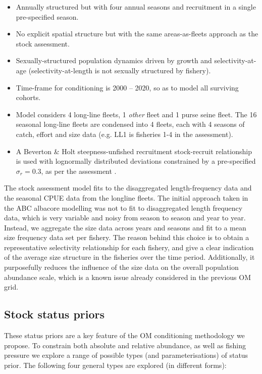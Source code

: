 \documentclass[12pt,a4paper,twoside,times,sky,standard]{csiroreport2017}
\begin{document}
\begin{itemize}
    \item Annually structured but with four annual seasons and recruitment in a single pre-specified season.
    \item No explicit spatial structure but with the same areas-as-fleets approach as the stock assessment.
    \item Sexually-structured population dynamics driven by growth and selectivity-at-age (selectivity-at-length is not sexually structured by fishery).
    \item Time-frame for conditioning is 2000 -- 2020, so as to model all surviving cohorts.
    \item Model considers 4 long-line fleets, 1 \emph{other} fleet and 1 purse seine fleet. The 16 seasonal long-line fleets are condensed into 4 fleets, each with 4 seasons of catch, effort and size data (e.g. LL1 is fisheries 1-4 in the assessment).
    \item A Beverton \& Holt steepness-unfished recruitment stock-recruit relationship is used with lognormally distributed deviations constrained by a pre-specified $\sigma_r=0.3$, as per the assessment \cite{albsa}.
\end{itemize}

The stock assessment model fits to the disaggregated length-frequency data and the seasonal CPUE data from the longline fleets. The initial approach taken in the ABC albacore modelling was not to fit to disaggregated length frequency data, which is very variable and noisy from season to season and year to year. Instead, we aggregate the size data across years and seasons and fit to a mean size frequency data set per fishery. The reason behind this choice is to obtain a representative selectivity relationship for each fishery, and give a clear indication of the average size structure in the fisheries over the time period. Additionally, it purposefully reduces the influence of the size data on the overall population abundance scale, which is a known issue already considered in the previous OM grid.

\subsection{Stock status priors}

These status priors are a key feature of the OM conditioning methodology we propose. To constrain both absolute and relative abundance, as well as fishing pressure we explore a range of possible types (and parameterisations) of status prior. The following four general types are explored (in different forms):
\end{document}
